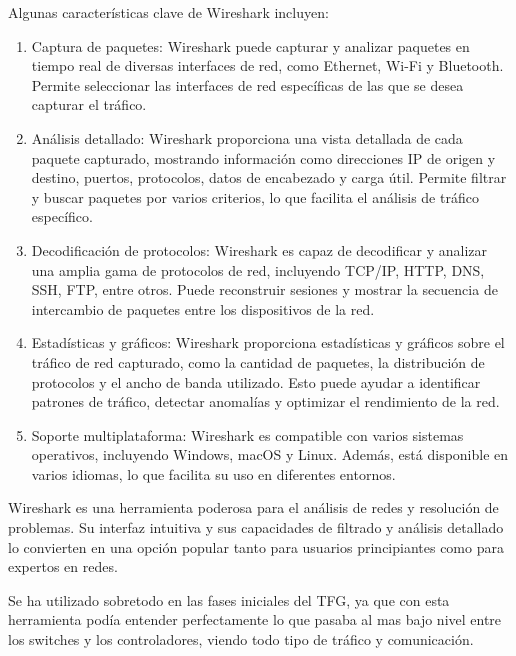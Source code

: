 \documentclass[a4paper, 12pt]{book}
\begin{document}
	Algunas características clave de Wireshark incluyen:
	
	\begin{enumerate}
		\item 	Captura de paquetes: Wireshark puede capturar y analizar paquetes en tiempo real de diversas interfaces de red, como Ethernet, Wi-Fi y Bluetooth. Permite seleccionar las interfaces de red específicas de las que se desea capturar el tráfico.	
		\item 	Análisis detallado: Wireshark proporciona una vista detallada de cada paquete capturado, mostrando información como direcciones IP de origen y destino, puertos, protocolos, datos de encabezado y carga útil. Permite filtrar y buscar paquetes por varios criterios, lo que facilita el análisis de tráfico específico.
		\item 	Decodificación de protocolos: Wireshark es capaz de decodificar y analizar una amplia gama de protocolos de red, incluyendo TCP/IP, HTTP, DNS, SSH, FTP, entre otros. Puede reconstruir sesiones y mostrar la secuencia de intercambio de paquetes entre los dispositivos de la red.
		\item 	Estadísticas y gráficos: Wireshark proporciona estadísticas y gráficos sobre el tráfico de red capturado, como la cantidad de paquetes, la distribución de protocolos y el ancho de banda utilizado. Esto puede ayudar a identificar patrones de tráfico, detectar anomalías y optimizar el rendimiento de la red.
		\item   Soporte multiplataforma: Wireshark es compatible con varios sistemas operativos, incluyendo Windows, macOS y Linux. Además, está disponible en varios idiomas, lo que facilita su uso en diferentes entornos.
	\end{enumerate}
	
	
	Wireshark es una herramienta poderosa para el análisis de redes y resolución de problemas. Su interfaz intuitiva y sus capacidades de filtrado y análisis detallado lo convierten en una opción popular tanto para usuarios principiantes como para expertos en redes.
	
	Se ha utilizado sobretodo en las fases iniciales del TFG, ya que con esta herramienta podía entender perfectamente lo que pasaba al mas bajo nivel entre los switches y los controladores, viendo todo tipo de tráfico y comunicación.	
	
	
	\cleardoublepage %
\end{document}
